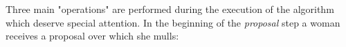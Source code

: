 {\begin{code}
\AgdaSymbol{(}\AgdaSpace{}%
\AgdaSpace{}%
\AgdaSpace{}%
\AgdaSymbol{)}\AgdaSpace{}%
\AgdaSpace{}%
\AgdaSpace{}%
\<%
\\
\>[0]\AgdaSpace{}%
\AgdaSpace{}%
\AgdaInductiveConstructor{[]}\AgdaSpace{}%
\AgdaSymbol{=}\AgdaSpace{}%
\AgdaInductiveConstructor{[]}\AgdaSpace{}%
\<%
\\
\>[0]\AgdaSpace{}%
\AgdaSpace{}%
\AgdaSymbol{((}\AgdaSpace{}%
\AgdaOperator{\AgdaInductiveConstructor{,}}\AgdaSpace{}%
\AgdaSymbol{)}\AgdaSpace{}%
\AgdaSpace{}%
\AgdaSymbol{)}\AgdaSpace{}%
\AgdaSpace{}%
\AgdaSpace{}%
\AgdaSpace{}%
\<%
\\
\>[0]\AgdaSpace{}%
\AgdaSymbol{|}\AgdaSpace{}%
\AgdaSpace{}%
\AgdaSymbol{\AgdaUnderscore{}}\AgdaSpace{}%
\AgdaSymbol{=}\AgdaSpace{}%
\<%
\\
\>[0]\AgdaSpace{}%
\AgdaSymbol{|}\AgdaSpace{}%
\AgdaSymbol{\AgdaUnderscore{}}%
\>[14]\AgdaSymbol{=}\AgdaSpace{}%
\AgdaSpace{}%
\AgdaSpace{}%
\<%
\\
\>[0]\<%
\end{code}

Three main "operations" are performed during the execution of the algorithm which deserve special attention. In the beginning of the \emph{proposal} step a woman receives a proposal over which she mulls:

}
